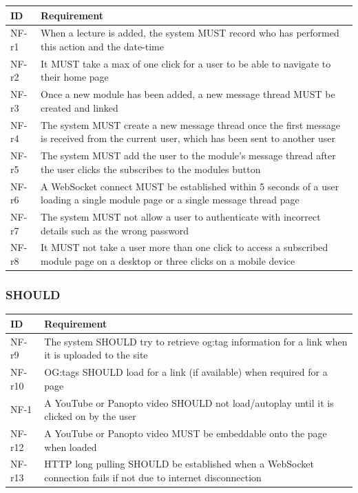\begin{tabular}{|p{1cm}|p{13cm}|}
    \hline
        \textbf{ID} & \textbf{Requirement} \\
    \hline
    NF-r1 &
    When a lecture is added, the system MUST record who has performed this action and the date-time \\
    \hline
    NF-r2 &
    It MUST take a max of one click for a user to be able to navigate to their home page \\
    \hline
    NF-r3 &
    Once a new module has been added, a new message thread MUST be created and linked \\
    \hline
    NF-r4 &
    The system MUST create a new message thread once the first message is received from the current user, which has been sent to another user \\
    \hline
    NF-r5 &
    The system MUST add the user to the module's message thread after the user clicks the subscribes to the modules button \\
    \hline
    NF-r6 &
    A WebSocket connect MUST be established within 5 seconds of a user loading a single module page or a single message thread page \\
    \hline
    NF-r7 &
    The system MUST not allow a user to authenticate with incorrect details such as the wrong password \\
    \hline
    NF-r8 &
    It MUST not take a user more than one click to access a subscribed module page on a desktop or three clicks on a mobile device \\ 
    \hline
\end{tabular}    

\subsubsection{SHOULD}

\begin{tabular}{|p{1cm}|p{13cm}|}
    \hline
        \textbf{ID} & \textbf{Requirement} \\
    \hline
    NF-r9 &
    The system SHOULD try to retrieve og:tag information for a link when it is uploaded to the site \\
    \hline
    NF-r10 &
    OG:tags SHOULD load for a link (if available) when required for a page \\
    \hline
    NF-1 &
    A YouTube or Panopto video SHOULD not load/autoplay until it is clicked on by the user \\
    \hline
    NF-r12 &
    A YouTube or Panopto video MUST be embeddable onto the page when loaded \\
    \hline
    NF-r13 &
    HTTP long pulling SHOULD be established when a WebSocket connection fails if not due to internet disconnection \\
    \hline
\end{tabular}

